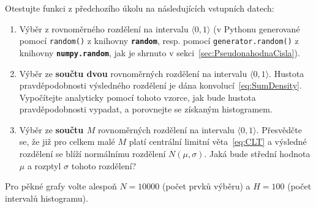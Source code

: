 \documentclass[a4paper,11pt,twoside]{article}
\def\code#1{\textnormal{\texttt{#1}}}
\def\file#1{\textnormal{\textbf{\texttt{#1}}}}
\theoremstyle{red}
\theoremstyle{green}
\begin{document}
    \begin{solved}\label{task:Distributions}
        Otestujte funkci z předchozího úkolu na následujících vstupních datech:
        \begin{enumerate}
            \item
                Výběr z rovnoměrného rozdělení na intervalu $\langle 0,1\rangle$ (v Pythonu generované pomocí \code{random()} z knihovny \file{random}, resp. pomocí \code{generator.random()} z knihovny \file{numpy.random}, jak je shrnuto v sekci~\ref{sec:PseudonahodnaCisla}).
            \item
                Výběr ze {\bf součtu dvou} rovnoměrných rozdělení na intervalu $\langle 0,1\rangle$.
                Hustota pravděpodobnosti výsledného rozdělení je dána konvolucí~\eqref{eq:SumDensity}.
                Vypočítejte analyticky pomocí tohoto vzorce, jak bude hustota pravděpodobnosti vypadat, a porovnejte se získaným histogramem.
            \item
                Výběr ze {\bf součtu $M$} rovnoměrných rozdělení na intervalu $\langle 0,1\rangle$.
                Přesvědčte se, že již pro celkem malé $M$ platí centrální limitní věta~\eqref{eq:CLT} a výsledné rozdělení se blíží normálnímu rozdělení $N(\mu,\sigma)$.
                Jaká bude střední hodnota $\mu$ a rozptyl $\sigma$ tohoto rozdělení?
        \end{enumerate}
        Pro pěkné grafy volte alespoň $N=10000$ (počet prvků výběru) a $H=100$ (počet intervalů histogramu).
    \end{solved}
    
\end{document}
